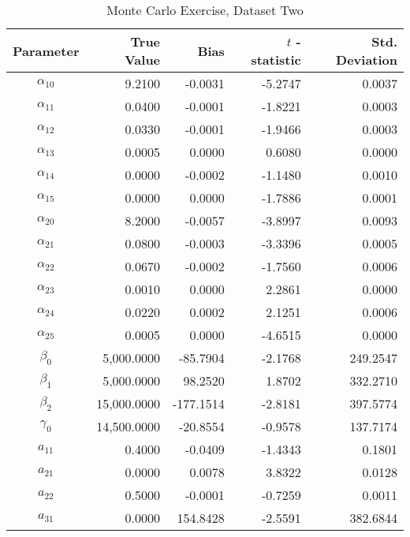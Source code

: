 \begin{table}\onehalfspacing
\begin{center}
\begin{threeparttable}
  \caption{Monte Carlo Exercise, Dataset Two}
  \label{Monte Carlo: Two}
  \begin{tabular}{crrrr}\toprule

  Parameter & True Value & Bias & $t$ - statistic & Std. Deviation \\
  \midrule
  $\alpha_{10}$ &      \phantom{20000}9.2100 &  -0.0031 & -5.2747 &   0.0037 \\
  $\alpha_{11}$ &      0.0400 &  -0.0001 & -1.8221 &   0.0003 \\
  $\alpha_{12}$ &      0.0330 &  -0.0001 & -1.9466 &   0.0003 \\
  $\alpha_{13}$ &      0.0005 &   0.0000 &  0.6080 &   0.0000 \\
  $\alpha_{14}$ &      0.0000 &  -0.0002 & -1.1480 &   0.0010 \\
  $\alpha_{15}$ &      0.0000 &   0.0000 & -1.7886 &   0.0001 \\
  $\alpha_{20}$ &      8.2000 &  -0.0057 & -3.8997 &   0.0093 \\
  $\alpha_{21}$ &      0.0800 &  -0.0003 & -3.3396 &   0.0005 \\
  $\alpha_{22}$ &      0.0670 &  -0.0002 & -1.7560 &   0.0006 \\
  $\alpha_{23}$ &      0.0010 &   0.0000 &  2.2861 &   0.0000 \\
  $\alpha_{24}$ &      0.0220 &   0.0002 &  2.1251 &   0.0006 \\
  $\alpha_{25}$ &      0.0005 &   0.0000 & -4.6515 &   0.0000 \\
  $\beta_{0}$   &   5,000.0000 & -85.7904 & -2.1768 & 249.2547 \\
  $\beta_{1}$   &   5,000.0000 &  98.2520 &  1.8702 & 332.2710 \\
  $\beta_{2}$   &  15,000.0000 &-177.1514 & -2.8181 & 397.5774 \\
  $\gamma_{0}$  &  14,500.0000 & -20.8554 & -0.9578 & 137.7174 \\
  $a_{11}$      &      0.4000 &  -0.0409 & -1.4343 &   0.1801 \\
  $a_{21}$      &      0.0000 &   0.0078 &  3.8322 &   0.0128 \\
  $a_{22}$      &      0.5000 &  -0.0001 & -0.7259 &   0.0011 \\
  $a_{31}$      &      0.0000 & 154.8428 & -2.5591 & 382.6844 \\

\end{tabular}
\end{threeparttable}
\end{center}
\end{table}
